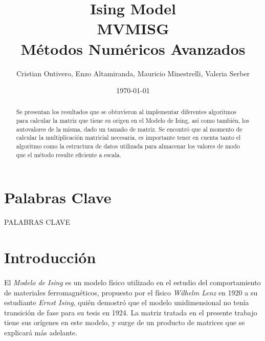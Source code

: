 \documentclass[a4paper,11pt]{article}
\title{Ising Model \\
MVMISG  \\ M\'etodos Num\'ericos Avanzados}
\author{Cristian Ontivero, Enzo Altamiranda, Mauricio Minestrelli, Valeria Serber}
\date{\today}
\begin{document}
\maketitle 
\thispagestyle{empty}
\vspace{3cm}

\renewcommand{\abstractname}{Resumen}
\begin{abstract}
Se presentan los resultados que se obtuvieron al implementar diferentes algoritmos para calcular la matriz que tiene su origen en el Modelo de Ising, as\'i como tambi\'en, los autovalores de la misma, dado un tamaño de matriz. Se encontr\'o que al momento de calcular la multiplicaci\'on matricial necesaria, es importante tener en cuenta tanto el algoritmo como la estructura de datos utilizada para almacenar los valores de modo que el m\'etodo resulte eficiente a escala.
\end{abstract}
\newpage
\section{Palabras Clave}
PALABRAS CLAVE

\newpage
\section{Introducci\'on}

\paragraph{}
El \emph{Modelo de Ising} es un modelo f\'isico utilizado en el estudio del comportamiento de materiales ferromagn\'eticos, propuesto por el f\'isico \emph{Wilhelm Lenz} en 1920 a su estudiante \emph{Ernst Ising}, qui\'en demostr\'o que el modelo unidimensional no ten\'ia transici\'on de fase para su tesis en 1924. La matriz tratada en el presente trabajo tiene sus or\'igenes en este modelo, y surge de un producto de matrices que se explicar\'a m\'as adelante.
\end{document}

